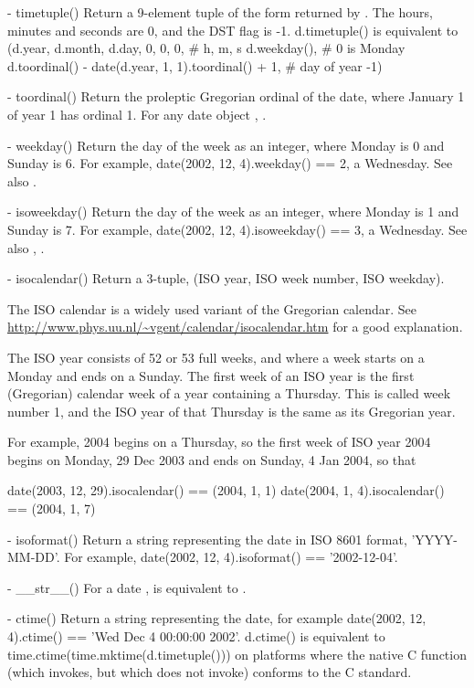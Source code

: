   - timetuple()
    Return a 9-element tuple of the form returned by
    .  The hours, minutes and seconds are
    0, and the DST flag is -1.
    d.timetuple() is equivalent to
        (d.year, d.month, d.day,
         0, 0, 0,  \# h, m, s
         d.weekday(),  \# 0 is Monday
         d.toordinal() - date(d.year, 1, 1).toordinal() + 1, \# day of year
         -1)

  - toordinal()
    Return the proleptic Gregorian ordinal of the date, where January 1
    of year 1 has ordinal 1.  For any date object ,
    .

  - weekday()
    Return the day of the week as an integer, where Monday is 0 and
    Sunday is 6.  For example, date(2002, 12, 4).weekday() == 2, a
    Wednesday.
    See also .

  - isoweekday()
    Return the day of the week as an integer, where Monday is 1 and
    Sunday is 7.  For example, date(2002, 12, 4).isoweekday() == 3, a
    Wednesday.
    See also , .

  - isocalendar()
    Return a 3-tuple, (ISO year, ISO week number, ISO weekday).

    The ISO calendar is a widely used variant of the Gregorian calendar.
    See \url{http://www.phys.uu.nl/~vgent/calendar/isocalendar.htm}
    for a good explanation.

    The ISO year consists of 52 or 53 full weeks, and where a week starts
    on a Monday and ends on a Sunday.  The first week of an ISO year is
    the first (Gregorian) calendar week of a year containing a Thursday.
    This is called week number 1, and the ISO year of that Thursday is
    the same as its Gregorian year.

    For example, 2004 begins on a Thursday, so the first week of ISO
    year 2004 begins on Monday, 29 Dec 2003 and ends on Sunday, 4 Jan
    2004, so that

    date(2003, 12, 29).isocalendar() == (2004, 1, 1)
    date(2004, 1, 4).isocalendar() == (2004, 1, 7)

  - isoformat()
    Return a string representing the date in ISO 8601 format,
    'YYYY-MM-DD'.  For example,
    date(2002, 12, 4).isoformat() == '2002-12-04'.

  - __str__()
    For a date ,  is equivalent to
    .

  - ctime()
    Return a string representing the date, for example
    date(2002, 12, 4).ctime() == 'Wed Dec  4 00:00:00 2002'.
    d.ctime() is equivalent to time.ctime(time.mktime(d.timetuple()))
    on platforms where the native C  function
    (which  invokes, but which
     does not invoke) conforms to the C standard.

